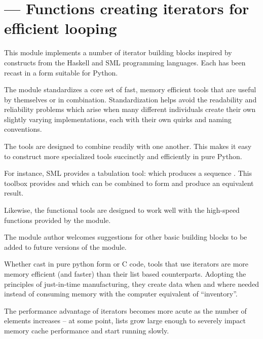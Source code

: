 \section{ ---
         Functions creating iterators for efficient looping}



This module implements a number of iterator building blocks inspired
by constructs from the Haskell and SML programming languages.  Each
has been recast in a form suitable for Python.

The module standardizes a core set of fast, memory efficient tools
that are useful by themselves or in combination.  Standardization helps
avoid the readability and reliability problems which arise when many
different individuals create their own slightly varying implementations,
each with their own quirks and naming conventions.

The tools are designed to combine readily with one another.  This makes
it easy to construct more specialized tools succinctly and efficiently
in pure Python.

For instance, SML provides a tabulation tool: 
which produces a sequence .  This toolbox
provides  and  which can be combined
to form  and produce an equivalent result.

Likewise, the functional tools are designed to work well with the
high-speed functions provided by the  module.

The module author welcomes suggestions for other basic building blocks
to be added to future versions of the module.

Whether cast in pure python form or C code, tools that use iterators
are more memory efficient (and faster) than their list based counterparts.
Adopting the principles of just-in-time manufacturing, they create
data when and where needed instead of consuming memory with the
computer equivalent of ``inventory''.

The performance advantage of iterators becomes more acute as the number
of elements increases -- at some point, lists grow large enough to
severely impact memory cache performance and start running slowly.

\begin{seealso}

\end{seealso}


